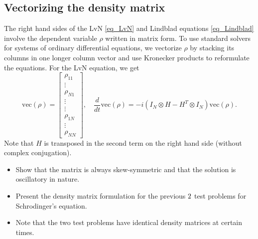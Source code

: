 \documentclass[11pt]{article}
\begin{document}
\subsection{Vectorizing the density matrix}

The right hand sides of the LvN  \eqref{eq_LvN} and Lindblad equations \eqref{eq_Lindblad} involve the dependent variable $\rho$
written in matrix form. To use standard solvers for systems of ordinary differential equations, we
vectorize $\rho$ by stacking its columns in one longer column vector and use Kronecker products to
reformulate the equations. For the LvN equation, we get
\[
\mbox{vec$(\rho)$} =
\begin{bmatrix}
  \rho_{11}\\
  \vdots \\
  \rho_{N1} \\
  \vdots\\
  \vdots\\
  \rho_{1N} \\
  \vdots \\
  \rho_{NN}
\end{bmatrix},\quad
%
\frac{d}{dt}\mbox{vec$(\rho)$} = -i\left( I_N\otimes H - H^T \otimes I_N \right)\mbox{vec$(\rho)$}.
\]
Note that $H$ is transposed in the second term on the right hand side (without complex conjugation).
\begin{itemize}
  \item Show that the matrix is always skew-symmetric and that the solution is oscillatory in nature.
  \item Present the density matrix formulation for the previous $2\time 2$ test problems for
    Schrodinger's equation.
  \item Note that the two test problems have identical density matrices at certain times.
\end{itemize}



\end{document}
